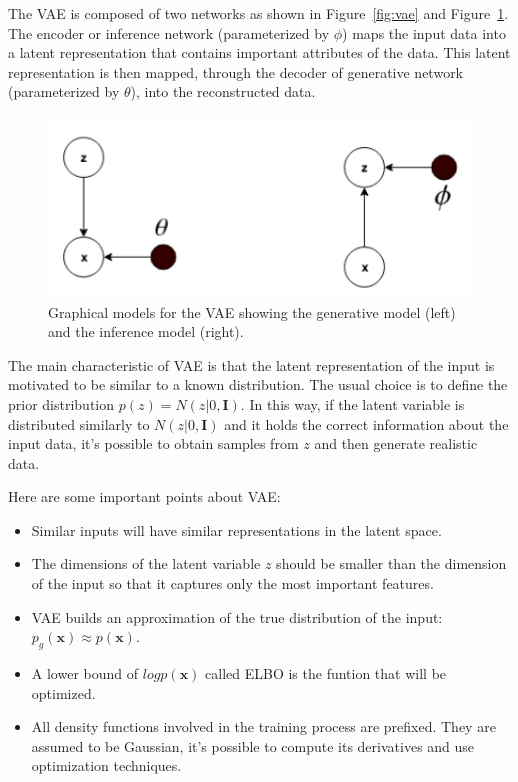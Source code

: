 \documentclass[5p,sort&compress]{elsarticle}
\begin{document}
The VAE is composed of two networks as shown in Figure~\ref{fig:vae} and Figure~\ref{fig:graphical}. The encoder or inference network (parameterized by $\phi$) maps the input data into a latent representation that contains important attributes of the data. This latent representation is then mapped, through the decoder of generative network (parameterized by $\theta$), into the reconstructed data.

\begin{figure}[ht]
     \centering
     \includegraphics[width = \linewidth]{figure/graphical_vae.png}
     \caption{Graphical models for the VAE showing the generative model (left) and the inference model (right).}
     \label{fig:graphical}
\end{figure}

The main characteristic of VAE is that the latent representation of the input is motivated to be similar to a known distribution. The usual choice is to define the prior distribution $p(z) = N(z|0, \boldsymbol{I})$. In this way, if the latent variable is distributed similarly to $N(z|0, \boldsymbol{I})$ and it holds the correct information about the input data, it's possible to obtain samples from $z$ and then generate realistic data.

Here are some important points about VAE:
\begin{itemize}
\item Similar inputs will have similar representations in the latent space.
\item The dimensions of the latent variable $z$ should be smaller than the dimension of the input so that it captures only the most important features.
\item VAE builds an approximation of the true distribution of the input: $p_g(\boldsymbol{x}) \approx p(\boldsymbol{x})$.
\item A lower bound of $log p(\boldsymbol{x})$ called ELBO is the funtion that will be optimized.
\item All density functions involved in the training process are prefixed. They are assumed to be Gaussian, it's possible to compute its derivatives and use optimization techniques.
\end{itemize}
\end{document}
